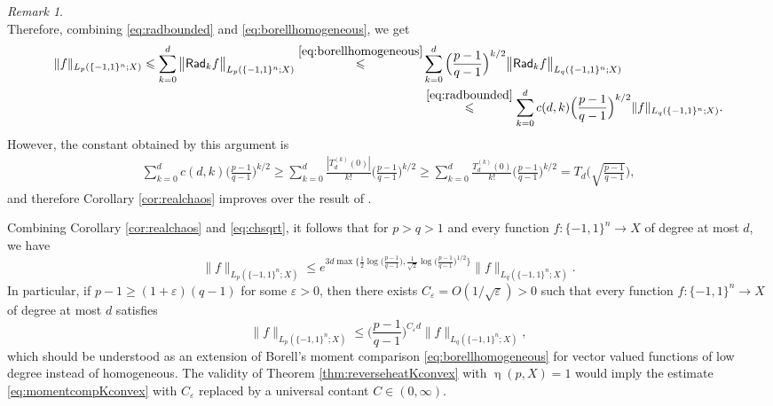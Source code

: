 \documentclass[11pt,reqno]{amsart}
\renewcommand{\leq}{\leqslant}
\renewcommand{\geq}{\geqslant}
\newcommand{\e}{\varepsilon}
\newcommand{\1}{\mathbf 1}
\theoremstyle{remark}
\newtheorem{remark}[theorem]{Remark}
\renewcommand{\eta}{\upeta}
\newcommand{\msf}{\mathsf}
\begin{document}
\begin{remark}
\begin{equation}
\end{equation}
Therefore, combining \eqref{eq:radbounded} and \eqref{eq:borellhomogeneous}, we get
\begin{equation}
\begin{split}
\|f\|_{L_p(\{-1,1\}^n;X)} \leq \sum_{k=0}^d \big\| \msf{Rad}_k f\big\|_{L_p(\{-1,1\}^n;X)}  \stackrel{\eqref{eq:borellhomogeneous}}{\leq} &\sum_{k=0}^d  \Big(\frac{p-1}{q-1}\Big)^{k/2}  \big\|\msf{Rad}_k f\big\|_{L_q(\{-1,1\}^n;X)} \\ & \stackrel{\eqref{eq:radbounded}}{\leq} \sum_{k=0}^d c(d,k) \Big(\frac{p-1}{q-1}\Big)^{k/2}  \|f\|_{L_q(\{-1,1\}^n;X)}.
\end{split}
\end{equation}
However, the constant obtained by this argument is
\begin{equation}
\begin{split}
\sum_{k=0}^d c(d,k) \Big(\frac{p-1}{q-1}\Big)^{k/2} \geq \sum_{k=0}^d \frac{|T_d^{(k)}(0)|}{k!} \Big(\frac{p-1}{q-1}\Big)^{k/2} \geq  \sum_{k=0}^d \frac{T_d^{(k)}(0)}{k!} \Big(\frac{p-1}{q-1}\Big)^{k/2}  = T_d\Big(\sqrt{\frac{p-1}{q-1}}\Big),
\end{split}
\end{equation}
and therefore Corollary \ref{cor:realchaos} improves over the result of \cite{KW92}. 
\end{remark}

Combining Corollary \ref{cor:realchaos} and \eqref{eq:chsqrt}, it follows that for $p>q>1$ and every function $f:\{-1,1\}^n\to X$ of degree at most $d$, we have
\begin{equation}
\|f\|_{L_p(\{-1,1\}^n;X)} \leq e^{3d\max\big\{ \frac{1}{2}\log\big(\frac{p-1}{q-1}\big), \frac{1}{\sqrt{2}}\log \big(\frac{p-1}{q-1} \big)^{1/2} \big\}}\|f\|_{L_q(\{-1,1\}^n;X)}.
\end{equation}
In particular, if $p-1 \geq (1+\e)(q-1)$ for some $\e>0$, then there exists $C_\e=O(1/\sqrt{\e})>0$ such that every function $f:\{-1,1\}^n\to X$ of degree at most $d$ satisfies
\begin{equation} \label{eq:momentcompKconvex}
\|f\|_{L_p(\{-1,1\}^n;X)} \leq \Big( \frac{p-1}{q-1} \Big)^{C_\e d}\|f\|_{L_q(\{-1,1\}^n;X)},
\end{equation}
which should be understood as an extension of Borell's moment comparison \eqref{eq:borellhomogeneous} for vector valued functions of low degree instead of homogeneous. The validity of Theorem \ref{thm:reverseheatKconvex} with $\eta(p,X)=1$ would imply the estimate \eqref{eq:momentcompKconvex} with $C_\e$ replaced by a universal contant $C\in(0,\infty)$.
\end{document}
